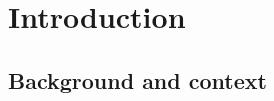 \newpage

\mainmatter %


\chapter{Introduction}\label{chapter_introduction}

\section{Background and context}\label{sec_background_and_context}

